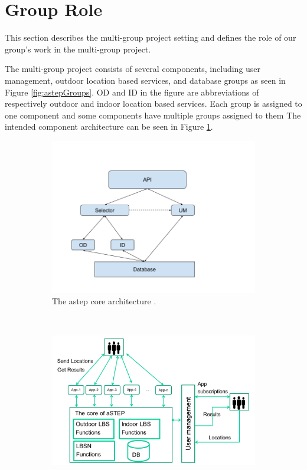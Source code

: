 \section{Group Role}\label{sec:grouprole}
This section describes the multi-group project setting and defines the role of our group’s work in the multi-group project.

The multi-group project consists of several components, including user management, outdoor location based services, and database groups as seen in Figure \ref{fig:astepGroups}.
OD and ID in the figure are abbreviations of respectively outdoor and indoor location based services.
Each group is assigned to one component and some components have multiple groups assigned to them
The intended component architecture can be seen in Figure \ref{fig:astepCore}.

\begin{figure}[h!]
	\centering
	\begin{subfigure}[b]{0.41\textwidth}
		\includegraphics[width=\textwidth,trim={0 0 4cm 0},clip]{figures/InformalArchitecture.png}
		\caption{The \gls{astep} core architecture \cite{astepArchitectureImage}. }
		\label{fig:astepCore}
	\end{subfigure}
	~ %
	\begin{subfigure}[b]{0.56\textwidth}
		\includegraphics[width=\textwidth]{figures/astepGroups.png}

\end{subfigure}
\end{figure}
